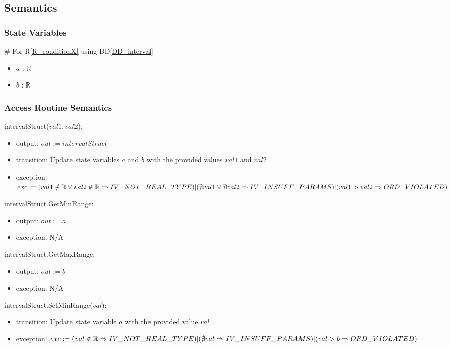 \documentclass[12pt, titlepage]{article}
\newcommand{\rref}[1]{R\ref{#1}}
\newcommand{\ddref}[1]{DD\ref{#1}}
\begin{document}
\subsection{Semantics}

\subsubsection{State Variables}

\# For \rref{R_conditionX} using \ddref{DD_interval}
\begin{itemize}
	\item $a$ : $\mathbb{R}$
	\item $b$ : $\mathbb{R}$
\end{itemize}

\subsubsection{Access Routine Semantics}

\noindent intervalStruct($val1, val2$):
\begin{itemize}
	\item output: $out := intervalStruct$
	\item transition: Update state variables $a$ and $b$ with the provided 
	values $val1$ and $val2$
	\item exception: $exc := \\
	(val1 \notin \mathbb{R} \vee val2 \notin \mathbb{R} \Rightarrow 
	IV\_NOT\_REAL\_TYPE) \\
	|\\
	(\nexists val1 \vee \nexists val2 \Rightarrow IV\_INSUFF\_PARAMS)\\
	|\\
	(val1 > val2 \Rightarrow ORD\_VIOLATED)$
\end{itemize}

\noindent intervalStruct.GetMinRange:
\begin{itemize}
	\item output: $out := a$
	\item exception: N/A
\end{itemize}

\noindent intervalStruct.GetMaxRange:
\begin{itemize}
	\item output: $out := b$
	\item exception: N/A
\end{itemize}

\noindent intervalStruct.SetMinRange($val$):
\begin{itemize}
	\item transition: Update state variable $a$ with the provided value $val$
	\item exception: $exc := \\
	(val \notin \mathbb{R} \Rightarrow IV\_NOT\_REAL\_TYPE) \\
	|\\
	(\nexists val \Rightarrow IV\_INSUFF\_PARAMS) \\
	|\\
	(val > b \Rightarrow ORD\_VIOLATED)$
\end{itemize}
\end{document}
